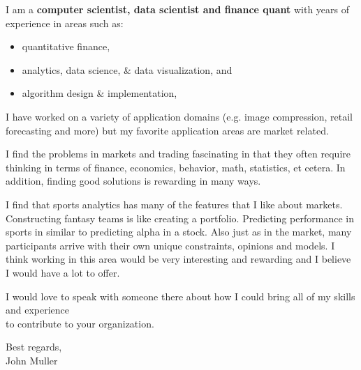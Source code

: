 \documentclass{letter}
\begin{document}
\noindent
I am a \textbf {computer scientist, data scientist and finance quant} with years of experience 
in areas such as:
\vspace{-.1in}
\begin{itemize}[noitemsep]
 \item quantitative finance, 
 \item analytics, data science, \& data visualization, and
 \item algorithm design \& implementation,
\end{itemize}

\noindent I have worked on a variety of application domains 
(e.g. image compression, retail forecasting and more)
but my favorite application areas are market related.

\noindent I find the problems in markets and trading fascinating in that they often require thinking in terms of finance, economics, behavior, math, statistics, et cetera.
In addition, finding good solutions is rewarding in many ways.


I find that sports analytics has many of the features that I like about markets.  Constructing fantasy teams is like creating a portfolio.  Predicting performance in sports in similar to predicting alpha in a stock.
Also just as in the market, many participants arrive with their own unique constraints, opinions and models.
I think working in this area would be very interesting and rewarding and I believe I would have a lot to offer.
 

\noindent
I would love to speak with someone there about how I could bring all of my skills and experience \\
to contribute to your organization.

\vspace*{0.2in}
\noindent Best regards,\\
John Muller
\end{document}

